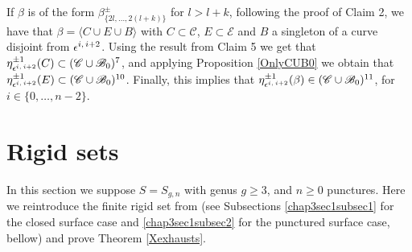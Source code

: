 \documentclass[twoside,11pt,a4paper]{article}
\newcommand*{\Cf}{\mathscr{C}}
\newcommand*{\Bf}{\mathscr{B}}
\newcommand*{\Ef}{\mathscr{E}}
\newcommand*{\eps}[2]{\epsilon^{#1, \hspace{0.05cm} #2}}
\begin{document}
If $\beta$ is of the form $\beta_{\{2l, \ldots, 2(l+k)\}}^{\pm}$ for $l > l+k$, following the proof of Claim 2, we have that $\beta = \langle C \cup E \cup B\rangle$ with $C \subset \Cf$, $E \subset \Ef$ and $B$ a singleton of a curve disjoint from $\eps{i}{i+2}$. Using the result from Claim 5 we get that $\eta_{\eps{i}{i+2}}^{\pm 1}(C) \subset (\Cf \cup \Bf_{0})^{7}$, and applying Proposition \ref{OnlyCUB0} we obtain that $\eta_{\eps{i}{i+2}}^{\pm 1}(E) \subset (\Cf \cup \Bf_{0})^{10}$. Finally, this implies that $\eta_{\eps{i}{i+2}}^{\pm 1}(\beta) \in (\Cf \cup \Bf_{0})^{11}$, for $i \in \{0, \ldots, n-2\}$.
\section{Rigid sets}\label{chap3}
\indent In this section we suppose $S = S_{g,n}$ with genus $g \geq 3$, and $n \geq  0$ punctures. Here we reintroduce the finite rigid set from \cite{Ara1} (see Subsections \ref{chap3sec1subsec1} for the closed surface case and \ref{chap3sec1subsec2} for the punctured surface case, bellow) and prove Theorem \ref{Xexhausts}.
\end{document}
